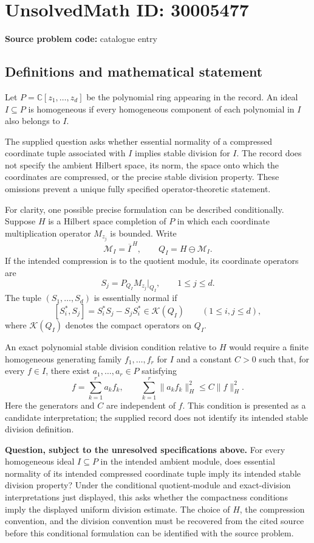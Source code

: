 \documentclass[11pt]{article}
\newcommand{\C}{\mathbb{C}}
\begin{document}
\section*{UnsolvedMath ID: 30005477}
\textbf{Source problem code:} catalogue entry
\subsection{Definitions and mathematical statement}
Let \(P=\C[z_1,\ldots,z_d]\) be the polynomial ring appearing in the record. An ideal \(I\subseteq P\) is homogeneous if every homogeneous component of each polynomial in \(I\) also belongs to \(I\).

The supplied question asks whether essential normality of a compressed coordinate tuple associated with \(I\) implies stable division for \(I\). The record does not specify the ambient Hilbert space, its norm, the space onto which the coordinates are compressed, or the precise stable division property. These omissions prevent a unique fully specified operator-theoretic statement.

For clarity, one possible precise formulation can be described conditionally. Suppose \(H\) is a Hilbert space completion of \(P\) in which each coordinate multiplication operator \(M_{z_j}\) is bounded. Write
\[
\mathcal M_I=\overline{I}^{\,H},\qquad Q_I=H\ominus\mathcal M_I.
\]
If the intended compression is to the quotient module, its coordinate operators are
\[
S_j=P_{Q_I}M_{z_j}|_{Q_I},\qquad 1\leq j\leq d.
\]
The tuple \((S_1,\ldots,S_d)\) is essentially normal if
\[
[S_i^*,S_j]=S_i^*S_j-S_jS_i^*\in\mathcal K(Q_I)
\qquad(1\leq i,j\leq d),
\]
where \(\mathcal K(Q_I)\) denotes the compact operators on \(Q_I\).

An exact polynomial stable division condition relative to \(H\) would require a finite homogeneous generating family \(f_1,\ldots,f_r\) for \(I\) and a constant \(C>0\) such that, for every \(f\in I\), there exist \(a_1,\ldots,a_r\in P\) satisfying
\[
f=\sum_{k=1}^{r}a_kf_k,
\qquad
\sum_{k=1}^{r}\|a_kf_k\|_H^2\leq C\|f\|_H^2.
\]
Here the generators and \(C\) are independent of \(f\). This condition is presented as a candidate interpretation; the supplied record does not identify its intended stable division definition.

\textbf{Question, subject to the unresolved specifications above.} For every homogeneous ideal \(I\subseteq P\) in the intended ambient module, does essential normality of its intended compressed coordinate tuple imply its intended stable division property? Under the conditional quotient-module and exact-division interpretations just displayed, this asks whether the compactness conditions imply the displayed uniform division estimate. The choice of \(H\), the compression convention, and the division convention must be recovered from the cited source before this conditional formulation can be identified with the source problem.
\end{document}
